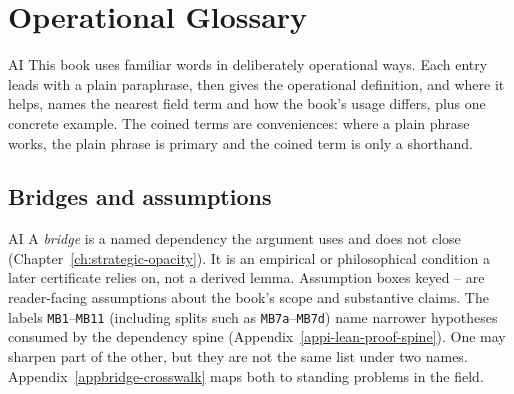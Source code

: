 \chapter{Operational Glossary}
\label{appf-glossary}

\begin{authbar}{AI}
This book uses familiar words in deliberately operational ways.
Each entry leads with a plain paraphrase, then gives the operational definition, and where it helps, names the nearest field term and how the book's usage differs, plus one concrete example.
The coined terms are conveniences: where a plain phrase works, the plain phrase is primary and the coined term is only a shorthand.

\end{authbar}
\authbarneedspace
\section*{Bridges and assumptions}
\begin{authbar}{AI}
A \emph{bridge} is a named dependency the argument uses and does not close (Chapter~\ref{ch:strategic-opacity}).
It is an empirical or philosophical condition a later certificate relies on, not a derived lemma.
Assumption boxes keyed -- are reader-facing assumptions about the book's scope and substantive claims.
The labels \texttt{MB1}--\texttt{MB11} (including splits such as \texttt{MB7a}--\texttt{MB7d}) name narrower hypotheses consumed by the dependency spine (Appendix~\ref{appi-lean-proof-spine}).
One may sharpen part of the other, but they are not the same list under two names.
Appendix~\ref{appbridge-crosswalk} maps both to standing problems in the field.

\end{authbar}
\authbarneedspace
